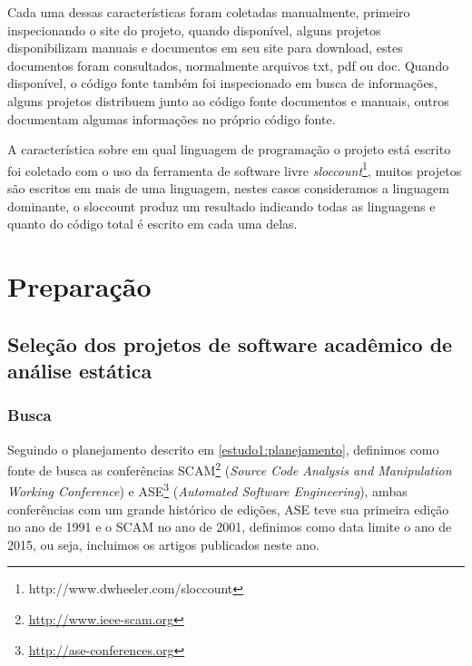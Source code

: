 Cada uma dessas características foram coletadas manualmente, primeiro
inspecionando o site do projeto, quando disponível, alguns projetos
disponibilizam manuais e documentos em seu site para download, estes documentos
foram consultados, normalmente arquivos txt, pdf ou doc. Quando disponível,
o código fonte também foi inspecionado em busca de informações, alguns projetos
distribuem junto ao código fonte documentos e manuais, outros documentam
algumas informações no próprio código fonte.

A característica sobre em qual linguagem de programação o projeto está escrito
foi coletado com o uso da ferramenta de software livre {\it
sloccount}\footnote{http://www.dwheeler.com/sloccount}, muitos projetos são
escritos em mais de uma linguagem, nestes casos consideramos a linguagem
dominante, o sloccount produz um resultado indicando todas as linguagens e
quanto do código total é escrito em cada uma delas.


\section{Preparação} \label{estudo1:preparacao}

\subsection{Seleção dos projetos de software acadêmico de análise estática} %

\subsubsection{Busca}


Seguindo o planejamento descrito em \ref{estudo1:planejamento}, definimos como
fonte de busca as conferências SCAM\footnote{\url{http://www.ieee-scam.org}}
({\it Source Code Analysis and Manipulation Working Conference}) e
ASE\footnote{\url{http://ase-conferences.org}} ({\it Automated Software
Engineering}), ambas conferências com um grande histórico de edições, ASE teve
sua primeira edição no ano de 1991 e o SCAM no ano de 2001, definimos como data
limite o ano de 2015, ou seja, incluimos os artigos publicados neste ano.

